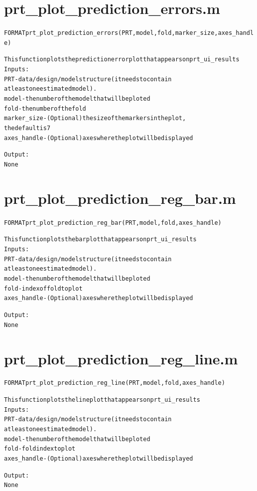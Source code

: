 \section{prt\_plot\_prediction\_errors.m}
\begin{alltt}

 FORMAT prt\_plot\_prediction\_errors(PRT, model, fold, marker\_size, axes\_handle)
 
 This function plots the prediction error plot that appears on prt\_ui\_results
 Inputs:
       PRT             - data/design/model structure (it needs to contain
                         at least one estimated model).
       model           - the number of the model that will be ploted
       fold            - the number of the fold
       marker\_size     - (Optional) the size of the markers in the plot,
                         the default is 7
       axes\_handle     - (Optional) axes where the plot will be displayed
 
 Output:
       None
\end{alltt}


\section{prt\_plot\_prediction\_reg\_bar.m}
\begin{alltt}

 FORMAT prt\_plot\_prediction\_reg\_bar(PRT, model, fold,axes\_handle)
 
 This function plots the bar plot that appears on prt\_ui\_results
 Inputs:
       PRT             - data/design/model structure (it needs to contain
                         at least one estimated model).
       model           - the number of the model that will be ploted
       fold            - index of fold to plot
       axes\_handle     - (Optional) axes where the plot will be displayed
 
 Output:
       None
\end{alltt}


\section{prt\_plot\_prediction\_reg\_line.m}
\begin{alltt}

 FORMAT prt\_plot\_prediction\_reg\_line(PRT, model, fold,axes\_handle)
 
 This function plots the line plot that appears on prt\_ui\_results
 Inputs:
       PRT             - data/design/model structure (it needs to contain
                         at least one estimated model).
       model           - the number of the model that will be ploted
       fold            - fold index to plot
       axes\_handle     - (Optional) axes where the plot will be displayed
 
 Output:
       None
\end{alltt}


